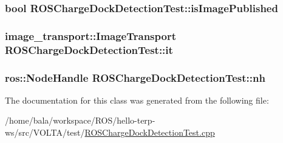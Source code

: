 \subsubsection[{\texorpdfstring{is\+Image\+Published}{isImagePublished}}]{\setlength{\rightskip}{0pt plus 5cm}bool R\+O\+S\+Charge\+Dock\+Detection\+Test\+::is\+Image\+Published}\hypertarget{class_r_o_s_charge_dock_detection_test_a297389df72184e25a23c0e2e5b10c651}{}\label{class_r_o_s_charge_dock_detection_test_a297389df72184e25a23c0e2e5b10c651}
\subsubsection[{\texorpdfstring{it}{it}}]{\setlength{\rightskip}{0pt plus 5cm}image\+\_\+transport\+::\+Image\+Transport R\+O\+S\+Charge\+Dock\+Detection\+Test\+::it}\hypertarget{class_r_o_s_charge_dock_detection_test_a3ac4e37b78d18b1f8ee54f5eba70b76d}{}\label{class_r_o_s_charge_dock_detection_test_a3ac4e37b78d18b1f8ee54f5eba70b76d}
\subsubsection[{\texorpdfstring{nh}{nh}}]{\setlength{\rightskip}{0pt plus 5cm}ros\+::\+Node\+Handle R\+O\+S\+Charge\+Dock\+Detection\+Test\+::nh}\hypertarget{class_r_o_s_charge_dock_detection_test_aae8eb6f78005ce4e90bdf6feb027c7b5}{}\label{class_r_o_s_charge_dock_detection_test_aae8eb6f78005ce4e90bdf6feb027c7b5}


The documentation for this class was generated from the following file\+:\begin{DoxyCompactItemize}
\item 
/home/bala/workspace/\+R\+O\+S/hello-\/terp-\/ws/src/\+V\+O\+L\+T\+A/test/\hyperlink{_r_o_s_charge_dock_detection_test_8cpp}{R\+O\+S\+Charge\+Dock\+Detection\+Test.\+cpp}\end{DoxyCompactItemize}
